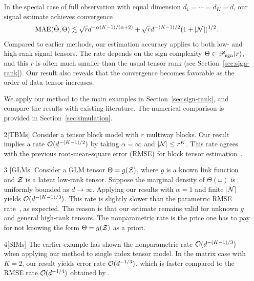 \documentclass{article}
\theoremstyle{plain}
\theoremstyle{definition}
\def\caliP{\mathscr{P}_{\textup{sgn}}}
\begin{document}
In the special case of full observation with equal dimension $d_1=\cdots=d_K=d$, our signal estimate achieves convergence
\begin{equation}
\textup{MAE}(\hat \Theta, \Theta)\lesssim \sqrt{r}d^{-\alpha(K-1)/(\alpha+2)}+ \sqrt{r}d^{-(K-1)/2}(1+|\mathcal{N}|)^{1/2}.
\end{equation}
Compared to earlier methods, our estimation accuracy applies to both low- and high-rank signal tensors. The rate depends on the sign complexity $\Theta\in\caliP(r)$, and this $r$ is often much smaller than the usual tensor rank (see Section~\ref{sec:sign-rank}). Our result also reveals that the convergence becomes favorable as the order of data tensor increases. 

We apply our method to the main examples in Section~\ref{sec:sign-rank}, and compare the results with existing literature. The numerical comparison is provided in Section~\ref{sec:simulation}. 

\begin{customexample}{2}[TBMs]
Consider a tensor block model with $r$ multiway blocks. Our result implies a rate $\mathcal{O}(d^{-(K-1)/2})$ by taking $\alpha=\infty$ and $|\mathcal{N}| \leq r^K$. This rate agrees with the  previous root-mean-square error (RMSE) for block tensor estimation~\citep{wang2019multiway}.
\end{customexample}


\begin{customexample}{3} [GLMs] 
Consider a GLM tensor $\Theta=g(\mathcal{Z})$, where $g$ is a known link function and $\mathcal{Z}$ is a latent low-rank tensor. Suppose the marginal density of $\Theta(\omega)$ is uniformly bounded as $d\to\infty$. Applying our results with $\alpha=1$ and finite $|\mathcal{N}|$ yields $\mathcal{O}(d^{-(K-1)/3})$. This rate is slightly slower than the parametric RMSE rate~\citep{zhang2018tensor,wang2018learning}, as expected. The reason is that our estimate remains valid for unknown $g$ and general high-rank tensors. The nonparametric rate is the price one has to pay for not knowing the form $\Theta=g(\mathcal{Z})$ as a priori. 
\end{customexample}

\begin{customexample}{4}[SIMs]
The earlier example has shown the nonparametric rate $\mathcal{O}(d^{-(K-1)/3})$ when applying our method to single index tensor model. In the matrix case with $K=2$, our result yields error rate $\mathcal{O}(d^{-1/3})$, which is faster compared to the RMSE rate $\mathcal{O}(d^{-1/4})$ obtained by \cite{ganti2015matrix}. 
\end{customexample}
\end{document}

